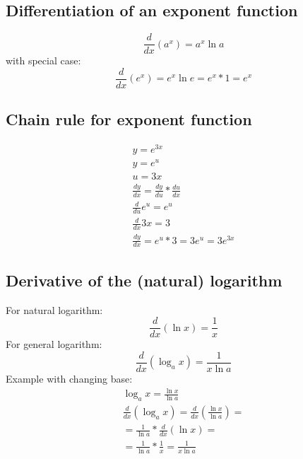 \documentclass{article}
\begin{document}
\subsection{Differentiation of an exponent function}
\begin{equation}
  \frac{d}{dx} (a^x) = a^x\ln a
\end{equation}
with special case:
\begin{equation}
  \frac{d}{dx} (e^x) = e^x\ln e = e^x * 1 = e^x
\end{equation}
\subsection{Chain rule for exponent function}
\begin{equation}
  \begin{gathered}
    y = e^{3x} \\
    y = e^u \\
    u = 3x \\
    \frac{dy}{dx} = \frac{dy}{du} * \frac{du}{dx} \\
    \frac{d}{du} e^u = e^u \\
    \frac{d}{dx} 3x = 3 \\
    \frac{dy}{dx} = e^u * 3 = 3e^u = 3e^{3x}
  \end{gathered}
\end{equation}

\subsection{Derivative of the (natural) logarithm}
For natural logarithm:
\begin{equation}
  \frac{d}{dx}(\ln x) = \frac{1}{x}
\end{equation}
For general logarithm:
\begin{equation}
  \frac{d}{dx}(\log_a x) = \frac{1}{x\ln a}
\end{equation}
Example with changing base:
\begin{equation}
  \begin{gathered}
    \log_ax = \frac{\ln x}{\ln a} \\
    \frac{d}{dx}(\log_ax) = \frac{d}{dx}(\frac{\ln x}{\ln a}) = \\
    = \frac{1}{\ln a} * \frac{d}{dx}(\ln x) = \\
    = \frac{1}{\ln a} * \frac{1}{x} = \frac{1}{x\ln a}
  \end{gathered}
\end{equation}
\end{document}
